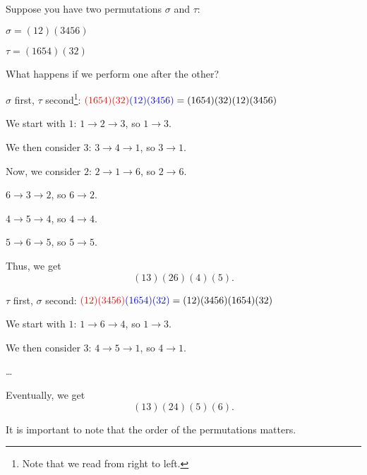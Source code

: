 \begin{example}
    Suppose you have two permutations $\sigma$ and $\tau$:

    \begin{listu}
        \item $\sigma = (1 2)(3 4 5 6)$
        \item $\tau = (1 6 5 4)(3 2)$
    \end{listu}

    What happens if we perform one after the other?

    \begin{listu}
        \item $\sigma$ first, $\tau$ second\footnote{Note that we read from right to left.}: $\color{red}(1 6 5 4)(3 2) \color{blue}(1 2)(3 4 5 6) \color{black} = (1 6 5 4)(3 2)(1 2)(3 4 5 6)$

        \begin{listu}
            \item We start with $1$: $1 \to 2 \to 3$, so $1 \to 3$. 
            \item We then consider $3$: $3 \to 4 \to 1$, so $3 \to 1$.
            \item Now, we consider $2$: $2 \to 1 \to 6$, so $2 \to 6$.
            \item $6 \to 3 \to 2$, so $6 \to 2$.
            \item $4 \to 5 \to 4$, so $4 \to 4$.
            \item $5 \to 6 \to 5$, so $5 \to 5$.
        \end{listu}

        Thus, we get \[(1 3)(2 6)(4)(5). \]

        \item $\tau$ first, $\sigma$ second: $\color{red}(1 2)(3 4 5 6) \color{blue}(1 6 5 4)(3 2) \color{black} = (1 2)(3 4 5 6)(1 6 5 4)(3 2)$

        \begin{listu}
            \item We start with $1$: $1 \to 6 \to 4$, so $1 \to 3$. 
            \item We then consider $3$: $4 \to 5 \to 1$, so $4 \to 1$.
            \item \dots
        \end{listu}

        Eventually, we get \[(1 3)(2 4)(5)(6). \]
    \end{listu}
        
    It is important to note that the order of the permutations matters.
\end{example}

